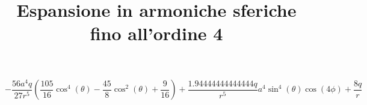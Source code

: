 \documentclass[11pt]{article}
\title{Espansione in armoniche sferiche fino all'ordine 4}
\begin{document}
 
\maketitle 


\[ - \frac{56 a^{4} q}{27 r^{5}} \left(\frac{105}{16} \cos^{4}{\left (\theta \right )} - \frac{45}{8} \cos^{2}{\left (\theta \right )} + \frac{9}{16}\right) + \frac{1.94444444444444 q}{r^{5}} a^{4} \sin^{4}{\left (\theta \right )} \cos{\left (4 \phi \right )} + \frac{8 q}{r} \] 
\end{document}
